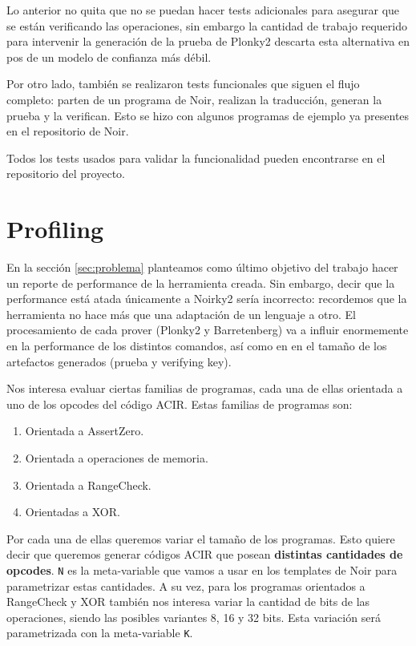 \documentclass[11pt,a4paper]{tesis}
\begin{document}
Lo anterior no quita que no se puedan hacer tests adicionales para asegurar que se están verificando las operaciones, sin embargo la cantidad de trabajo requerido para intervenir la generación de la prueba de Plonky2 descarta esta alternativa en pos de un modelo de confianza más débil. 

Por otro lado, también se realizaron tests funcionales que siguen el flujo completo: parten de un programa de Noir, realizan la traducción, generan la prueba y la verifican. Esto se hizo con algunos programas de ejemplo ya presentes en el repositorio de Noir.

Todos los tests usados para validar la funcionalidad pueden encontrarse en el repositorio del proyecto.



\section{Profiling}\label{sec:materiales_y_metodos}
En la sección \ref{sec:problema} planteamos como último objetivo del trabajo hacer un reporte de performance de la herramienta creada. Sin embargo, decir que la performance está atada únicamente a Noirky2 sería incorrecto: recordemos que la herramienta no hace más que una adaptación de un lenguaje a otro. El procesamiento de cada prover (Plonky2 y Barretenberg) va a influir enormemente en la performance de los distintos comandos, así como en en el tamaño de los artefactos generados (prueba y verifying key).

Nos interesa evaluar ciertas familias de programas, cada una de ellas orientada a uno de los opcodes del código ACIR. Estas familias de programas son: 
\begin{enumerate}
    \item Orientada a AssertZero.
    \item Orientada a operaciones de memoria.
    \item Orientada a RangeCheck.
    \item Orientadas a XOR.
\end{enumerate}

Por cada una de ellas queremos variar el tamaño de los programas. Esto quiere decir que queremos generar códigos ACIR que posean \textbf{distintas cantidades de opcodes}. \texttt{N} es la meta-variable que vamos a usar en los templates de Noir para parametrizar estas cantidades. A su vez, para los programas orientados a RangeCheck y XOR también nos interesa variar la cantidad de bits de las operaciones, siendo las posibles variantes 8, 16 y 32 bits. Esta variación será parametrizada con la meta-variable \texttt{K}. 
\end{document}
